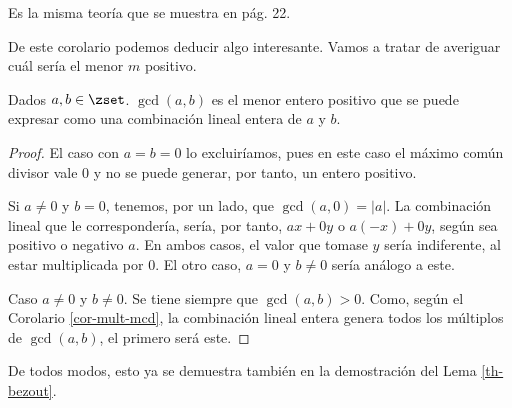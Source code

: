 Es la misma teoría que se muestra en \cite{burton} pág. 22.

De este corolario podemos deducir algo interesante. Vamos a tratar de
averiguar cuál sería el menor $m$ positivo.

\begin{corollary}\label{id-bezout-2}
  Dados $a, b \in \zset$. $\gcd(a, b)$ es el menor entero positivo que se
  puede expresar como una combinación lineal entera de $a$ y $b$.
\end{corollary}

\begin{proof}
  El caso con $a = b = 0$ lo excluiríamos, pues en este caso el máximo común
  divisor vale 0 y no se puede generar, por tanto, un entero positivo.

  Si $a \neq 0$ y $b = 0$, tenemos, por un lado, que $\gcd(a, 0) = |a|$. La
  combinación lineal que le correspondería, sería, por tanto, $ax + 0y$ o
  $a({-x}) + 0y$, según sea positivo o negativo $a$. En ambos casos, el
  valor que tomase $y$ sería indiferente, al estar multiplicada por 0. El
  otro caso, $a = 0$ y $b \neq 0$ sería análogo a este.

  Caso $a \neq 0$ y $b \neq 0$. Se tiene siempre que $\gcd(a, b) > 0$. Como,
  según el Corolario \ref{cor-mult-mcd}, la combinación lineal entera genera
  todos los múltiplos de $\gcd(a, b)$, el primero será este.
\end{proof}

\iffalse
No sé si poner o quitar la excepción del 00. Para este caso no es entero
positivo, sino 0. TKTK.
\fi

De todos modos, esto ya se demuestra también en la demostración del Lema
\ref{th-bezout}.






